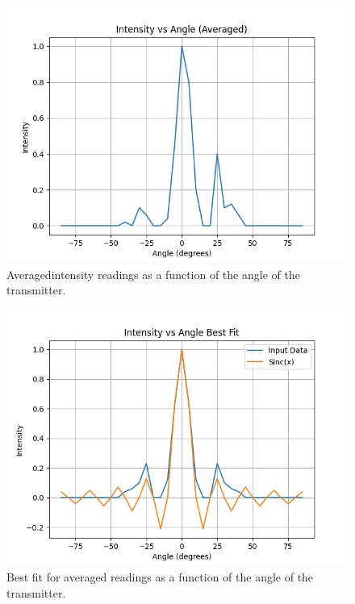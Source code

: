 \documentclass[10pt]{article}
\begin{document}
\begin{figure}
  \centering
  \includegraphics[scale=0.6]{plots/plot2.png}
  \caption{Averagedintensity readings as a function of the angle of the transmitter.}
  \label{fig:4}
\end{figure}\begin{figure}
  \centering
  \includegraphics[scale=0.6]{plots/plot3.png}
  \caption{Best fit for averaged readings as a function of the angle of the transmitter.}
  \label{fig:5}
\end{figure}
\end{document}
